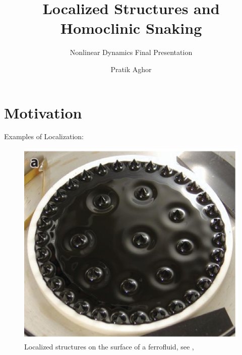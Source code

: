 \documentclass{beamer}
\title{Localized Structures and Homoclinic Snaking}
\subtitle{Nonlinear Dynamics Final Presentation}
\author{Pratik Aghor}
\begin{document}
\maketitle
\section{Motivation}
\begin{frame}{Examples of Localization:}
\begin{figure}[ht]
  \centering
  \includegraphics[scale=0.6]
  {Figs/ferrofluid.png}  
  \caption{Localized structures on the surface of a ferrofluid, see \cite{richter2005two}, \cite{knobloch2015spatial}}
  \label{fig:ferrofluid}
\end{figure}
\end{frame}
\end{document}
